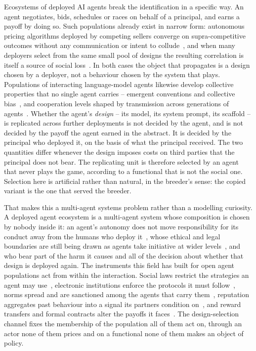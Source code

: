 \documentclass[pdflatex]{sn-jnl}
\theoremstyle{thmstyleone}
\theoremstyle{thmstylethree}
\theoremstyle{thmstyletwo}
\begin{document}
Ecosystems of deployed AI agents break the identification in a specific way.
An agent negotiates, bids, schedules or races on behalf of a principal, and
earns a payoff by doing so. Such populations already exist in narrow form:
autonomous pricing algorithms deployed by competing sellers converge on
supra-competitive outcomes without any communication or intent to
collude~\citep{calvano2020collusion}, and when many deployers select from the
same small pool of designs the resulting correlation is itself a source of
social loss~\citep{kleinberg2021monoculture}. In both cases the object that
propagates is a design chosen by a deployer, not a behaviour chosen by the
system that plays. Populations of interacting language-model agents likewise
develop collective properties that no single agent carries -- emergent
conventions and collective bias~\citep{ashery2025emergent}, and cooperation
levels shaped by transmission across generations of
agents~\citep{vallinder2024cultural,willis2025llm}. Whether the agent's \emph{design} -- its model,
its system prompt, its scaffold -- is replicated across further deployments
is not decided by the agent, and is not decided by the payoff the agent earned
in the abstract. It is decided by the principal who deployed it, on the basis
of what the principal received. The two quantities differ whenever the design
imposes costs on third parties that the principal does not bear. The
replicating unit is therefore selected by an agent that never plays the game,
according to a functional that is not the social one. Selection here is
artificial rather than natural, in the breeder's sense: the copied variant is
the one that served the breeder.

That makes this a multi-agent systems problem rather than a modelling
curiosity. A deployed agent ecosystem is a multi-agent system whose
composition is chosen by nobody inside it: an agent's autonomy does not move
responsibility for its conduct away from the humans who deploy
it~\citep{chan2023harms}, whose ethical and legal boundaries are still being
drawn as agents take initiative at wider levels~\citep{wellman2017ethical},
and who bear part of the harm it causes and all of the decision about whether
that design is deployed again. The instruments this field has built for open
agent populations act from within the interaction. Social laws restrict the
strategies an agent may use~\citep{shoham1995social}, electronic institutions
enforce the protocols it must follow~\citep{arcos2005electronic}, norms spread
and are sanctioned among the agents that carry
them~\citep{morrismartin2019norm,nardin2016sanctions}, reputation aggregates
past behaviour into a signal its partners condition
on~\citep{huynh2006integrated}, and reward transfers and formal contracts
alter the payoffs it faces~\citep{willis2024minimal,haupt2024contracts}. The
design-selection channel fixes the membership of the population all of them
act on, through an actor none of them prices and on a functional none of them
makes an object of policy.
\end{document}
